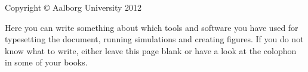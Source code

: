 \thispagestyle{empty}
{\small
\strut\vfill
\noindent Copyright \copyright{} Aalborg University 2012\par
\vspace{0.2cm}
\noindent Here you can write something about which tools and software you have used for typesetting the document, running simulations and creating figures. If you do not know what to write, either leave this page blank or have a look at the colophon in some of your books.
}
\clearpage